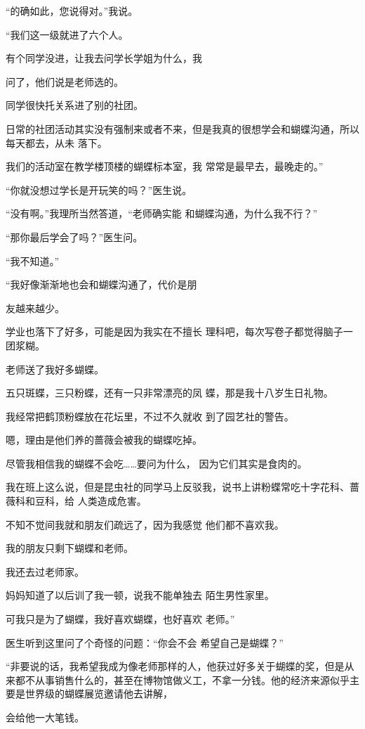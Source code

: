 \documentclass{article}
\begin{document}
“的确如此，您说得对。”我说。 


“我们这一级就进了六个人。 

有个同学没进，让我去问学长学姐为什么，我

\newpage
问了，他们说是老师选的。 


同学很快托关系进了别的社团。 

日常的社团活动其实没有强制来或者不来，但是我真的很想学会和蝴蝶沟通，所以每天都去，从未
落下。 

我们的活动室在教学楼顶楼的蝴蝶标本室，我
常常是最早去，最晚走的。” 

“你就没想过学长是开玩笑的吗？”医生说。

“没有啊。”我理所当然答道，“老师确实能
和蝴蝶沟通，为什么我不行？” 


“那你最后学会了吗？”医生问。 


“我不知道。” 

“我好像渐渐地也会和蝴蝶沟通了，代价是朋

\newpage
友越来越少。 

学业也落下了好多，可能是因为我实在不擅长
理科吧，每次写卷子都觉得脑子一团浆糊。 


老师送了我好多蝴蝶。 

五只斑蝶，三只粉蝶，还有一只非常漂亮的凤
蝶，那是我十八岁生日礼物。 

我经常把鹤顶粉蝶放在花坛里，不过不久就收
到了园艺社的警告。 

嗯，理由是他们养的蔷薇会被我的蝴蝶吃掉。

尽管我相信我的蝴蝶不会吃……要问为什么，
因为它们其实是食肉的。 

我在班上这么说，但是昆虫社的同学马上反驳我，说书上讲粉蝶常吃十字花科、蔷薇科和豆科，给
人类造成危害。 

\newpage

不知不觉间我就和朋友们疏远了，因为我感觉
他们都不喜欢我。 


我的朋友只剩下蝴蝶和老师。 


我还去过老师家。 

妈妈知道了以后训了我一顿，说我不能单独去
陌生男性家里。 

可我只是为了蝴蝶，我好喜欢蝴蝶，也好喜欢
老师。” 

医生听到这里问了个奇怪的问题：“你会不会
希望自己是蝴蝶？” 

“非要说的话，我希望我成为像老师那样的人，他获过好多关于蝴蝶的奖，但是从来都不从事销售什么的，甚至在博物馆做义工，不拿一分钱。他的经济来源似乎主要是世界级的蝴蝶展览邀请他去讲解，

\newpage
会给他一大笔钱。 
\end{document}
